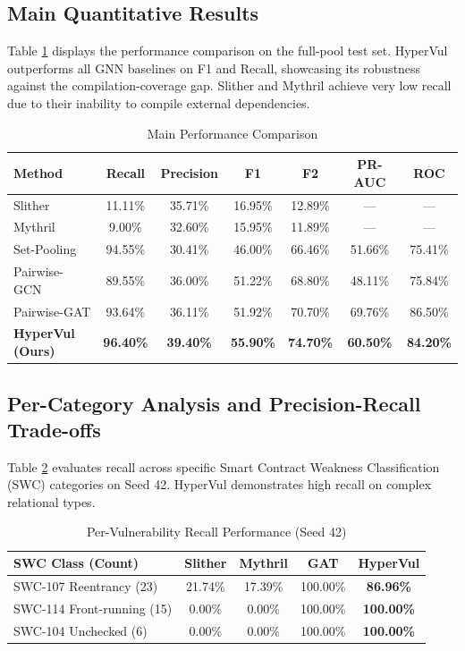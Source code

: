 \documentclass[conference]{IEEEtran}
\begin{document}
\subsection{Main Quantitative Results}
Table \ref{tab:main} displays the performance comparison on the full-pool test set. HyperVul outperforms all GNN baselines on F1 and Recall, showcasing its robustness against the compilation-coverage gap. Slither and Mythril achieve very low recall due to their inability to compile external dependencies.

\begin{table}[h]
\centering
\caption{Main Performance Comparison}
\label{tab:main}
\begin{tabular}{lcccccc}
\toprule
\textbf{Method} & \textbf{Recall} & \textbf{Precision} & \textbf{F1} & \textbf{F2} & \textbf{PR-AUC} & \textbf{ROC} \\
\midrule
Slither & 11.11\% & 35.71\% & 16.95\% & 12.89\% & — & — \\
Mythril & 9.00\% & 32.60\% & 15.95\% & 11.89\% & — & — \\
Set-Pooling & 94.55\% & 30.41\% & 46.00\% & 66.46\% & 51.66\% & 75.41\% \\
Pairwise-GCN & 89.55\% & 36.00\% & 51.22\% & 68.80\% & 48.11\% & 75.84\% \\
Pairwise-GAT & 93.64\% & 36.11\% & 51.92\% & 70.70\% & 69.76\% & 86.50\% \\
\textbf{HyperVul (Ours)} & \textbf{96.40\%} & \textbf{39.40\%} & \textbf{55.90\%} & \textbf{74.70\%} & \textbf{60.50\%} & \textbf{84.20\%} \\
\bottomrule
\end{tabular}
\end{table}

\subsection{Per-Category Analysis and Precision-Recall Trade-offs}
Table \ref{tab:swc} evaluates recall across specific Smart Contract Weakness Classification (SWC) categories on Seed 42. HyperVul demonstrates high recall on complex relational types.

\begin{table}[h]
\centering
\caption{Per-Vulnerability Recall Performance (Seed 42)}
\label{tab:swc}
\begin{tabular}{lcccc}
\toprule
\textbf{SWC Class (Count)} & \textbf{Slither} & \textbf{Mythril} & \textbf{GAT} & \textbf{HyperVul} \\
\midrule
SWC-107 Reentrancy (23) & 21.74\% & 17.39\% & 100.00\% & \textbf{86.96\%} \\
SWC-114 Front-running (15) & 0.00\% & 0.00\% & 100.00\% & \textbf{100.00\%} \\
SWC-104 Unchecked (6) & 0.00\% & 0.00\% & 100.00\% & \textbf{100.00\%} \\
\bottomrule
\end{tabular}
\end{table}
\end{document}
